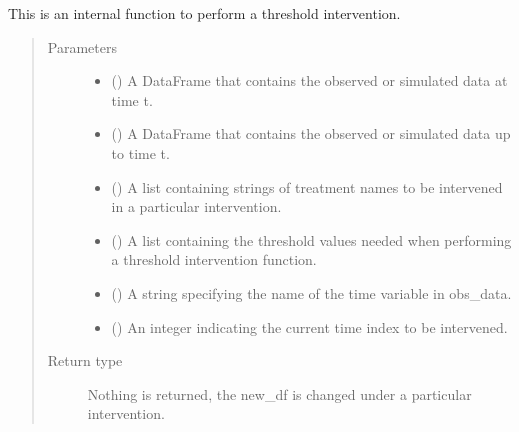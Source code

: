 \documentclass[letterpaper,10pt,english]{sphinxmanual}
\begin{document}
\begin{fulllineitems}
\label{\detokenize{Specifications/Interventions:pygformula.parametric_gformula.interventions.threshold}}
\sphinxAtStartPar
This is an internal function to perform a threshold intervention.
\begin{quote}\begin{description}
\item[{Parameters}] \leavevmode\begin{itemize}
\item {} 
\sphinxAtStartPar
{} () \textendash{} A DataFrame that contains the observed or simulated data at time t.

\item {} 
\sphinxAtStartPar
{} () \textendash{} A DataFrame that contains the observed or simulated data up to time t.

\item {} 
\sphinxAtStartPar
{} () \textendash{} A list containing strings of treatment names to be intervened in a particular intervention.

\item {} 
\sphinxAtStartPar
{} () \textendash{} A list containing the threshold values needed when performing a threshold intervention function.

\item {} 
\sphinxAtStartPar
{} () \textendash{} A string specifying the name of the time variable in obs\_data.

\item {} 
\sphinxAtStartPar
{} () \textendash{} An integer indicating the current time index to be intervened.

\end{itemize}

\item[{Return type}] \leavevmode
\sphinxAtStartPar
Nothing is returned, the new\_df is changed under a particular intervention.

\end{description}\end{quote}

\end{fulllineitems}
\end{document}
